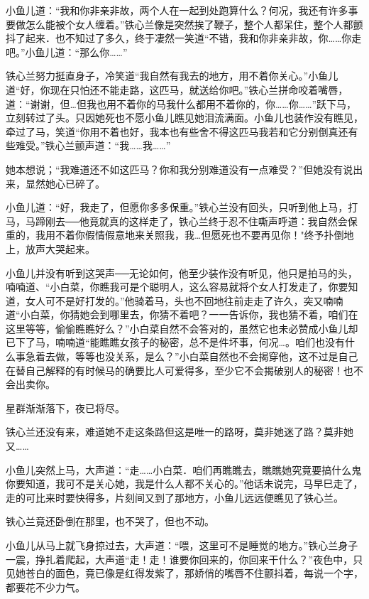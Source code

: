 \documentclass[12pt,oneside]{book}
\begin{document}
小鱼儿道：``我和你非亲非故，两个人在一起到处跑算什么？何况，我还有许多事要做怎么能被个女人缠着。''铁心兰像是突然挨了鞭子，整个人都呆住，整个人都颤抖了起来．也不知过了多久，终于凄然一笑道``不错，我和你非亲非故，你\ldots\ldots 你走吧。''小鱼儿道：``那么你\ldots\ldots{}''

铁心兰努力挺直身子，冷笑道``我自然有我去的地方，用不着你关心。''小鱼儿道``好，你现在只怕还不能走路，这匹马，就送给你吧。''铁心兰拼命咬着嘴唇，道：``谢谢，但\ldots 但我也用不着你的马我什么都用不着你的，你\ldots\ldots 你\ldots\ldots{}''跃下马，立刻转过了头。只因她死也不愿小鱼儿瞧见她泪流满面。小鱼儿也装作没有瞧见，牵过了马，笑道``你用不着也好，我本也有些舍不得这匹马我若和它分别倒真还有些难受。''铁心兰颤声道：``我\ldots\ldots 我\ldots\ldots{}''

她本想说；``我难道还不如这匹马？你和我分别难道没有一点难受？''但她没有说出来，显然她心已碎了。

小鱼儿道：``好，我走了，但愿你多多保重。''铁心兰没有回头，只听到他上马，打马，马蹄刚去──他竟就真的这样走了，铁心兰终于忍不住嘶声呼道：我自然会保重的，我用不着你假情假意地来关照我，我\ldots 但愿死也不要再见你！"终予扑倒地上，放声大哭起来。

小鱼儿并没有听到这哭声──无论如何，他至少装作没有听见，他只是拍马的头，喃喃道、``小白菜，你瞧我可是个聪明人，这么容易就将个女人打发走了，你要知道，女人可不是好打发的。''他骑着马，头也不回地往前走走了许久，突又喃喃道``小白菜，你猜她会到哪里去，你猜不着吧？一一告诉你，我也猜不着，咱们在这里等等，偷偷瞧瞧好么？''小白菜自然不会答对的，虽然它也未必赞成小鱼儿却已下了马，喃喃道``能瞧瞧女孩子的秘密，总不是件坏事，何况\ldots。咱们也没有什么事急着去做，等等也没关系，是么？''小白菜自然也不会揭穿他，这不过是自己在替自己解释的有时候马的确要比人可爱得多，至少它不会揭破别人的秘密！也不会出卖你。

星群渐渐落下，夜已将尽。

铁心兰还没有来，难道她不走这条路但这是唯一的路呀，莫非她迷了路？莫非她又\ldots\ldots{}

小鱼儿突然上马，大声道：``走\ldots\ldots 小白菜．咱们再瞧瞧去，瞧瞧她究竟要搞什么鬼你要知道，我可不是关心她，我是什么人都不关心的。''他话未说完，马早巳走了，走的可比来时要快得多，片刻间又到了那地方，小鱼儿远远便瞧见了铁心兰。

铁心兰竟还卧倒在那里，也不哭了，但也不动。

小鱼儿从马上就飞身掠过去，大声道：``喂，这里可不是睡觉的地方。''铁心兰身子一震，挣扎着爬起，大声道``走！走！谁要你回来的，你回来干什么？''夜色中，只见她苍白的面色，竟已像是红得发紫了，那娇俏的嘴唇不住颤抖着，每说一个字，都要花不少力气。
\end{document}
